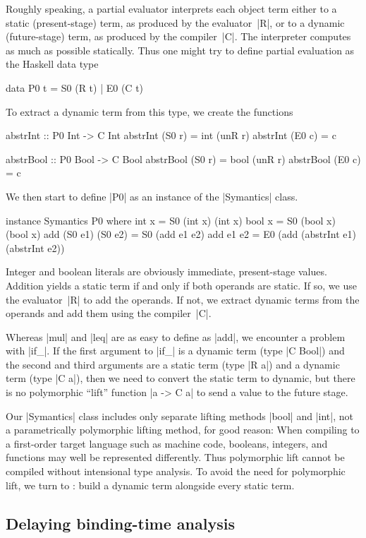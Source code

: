 \documentclass[preprint]{sigplanconf}
\begin{document}
Roughly speaking, a partial evaluator interprets each object term either
to a static (present-stage) term, as produced by the evaluator~|R|, or
to a dynamic (future-stage) term, as produced by the compiler~|C|.  The
interpreter computes as much as possible statically.  Thus one might try
to define partial evaluation as the Haskell data type
\begin{code}
data P0 t = S0 (R t) | E0 (C t)
\end{code}
To extract a dynamic term from this type, we create the functions
\begin{code}
abstrInt :: P0 Int -> C Int
abstrInt (S0 r) = int (unR r)
abstrInt (E0 c) = c

abstrBool :: P0 Bool -> C Bool
abstrBool (S0 r) = bool (unR r)
abstrBool (E0 c) = c
\end{code}
We then start to define |P0| as an instance of the |Symantics| class.
\begin{code}
instance Symantics P0 where
  int  x = S0 (int x) (int x)
  bool x = S0 (bool x) (bool x)
  add (S0 e1) (S0 e2) = S0 (add e1 e2)
  add e1 e2 = E0 (add (abstrInt e1)
                      (abstrInt e2))
\end{code}
Integer and boolean literals are obviously immediate, present-stage
values. Addition yields a static term if and only if both operands
are static. If so, we use the evaluator~|R| to add the operands.
If not, we extract dynamic terms from the operands and add them
using the compiler~|C|.

Whereas |mul| and |leq| are as easy to define as |add|, we encounter
a problem with |if_|.  If the first argument to |if_| is a dynamic term
(type |C Bool|) and the second and third arguments are a static term
(type |R a|) and a dynamic term (type |C a|), then we need to convert
the static term to dynamic, but there is no polymorphic ``lift''
function |a -> C a| to send a value to the future stage.

Our |Symantics| class includes only separate lifting methods |bool| and
|int|, not a parametrically polymorphic lifting method, for good reason:
When compiling to a first-order target language such as machine code,
booleans, integers, and functions may well be represented differently.
Thus polymorphic lift cannot be compiled without intensional type
analysis.  To avoid the need for polymorphic lift, we turn to
\citet[see also \citealp{sumii-hybrid}]{asai-binding-time}:
build a dynamic term
alongside every static term.

\subsection{Delaying binding-time analysis}
\label{S:PE-problem}
\end{document}
